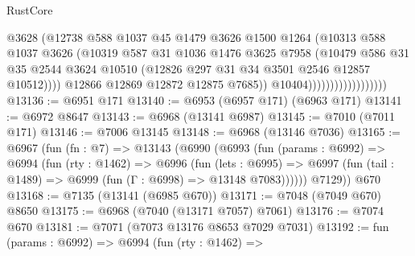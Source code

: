 \begin{lexlean}{RustCore}
\begin{coremodule}
                                          @3628
                                          (@12738
                                            @588
                                            @1037
                                            @45
                                            @1479
                                            @3626
                                            @1500
                                            @1264
                                            (@10313
                                              @588
                                              @1037
                                              @3626
                                              (@10319
                                                @587
                                                @31
                                                @1036
                                                @1476
                                                @3625
                                                @7958
                                                (@10479
                                                  @586
                                                  @31
                                                  @35
                                                  @2544
                                                  @3624
                                                  @10510
                                                  (@12826 @297 @31 @34 @3501 @2546 @12857 @10512))))
                                            @12866
                                            @12869
                                            @12872
                                            @12875
                                            @7685))
                                        @10404))))))))))))))))))
@13136 := @6951 @171
@13140 := @6953 (@6957 @171) (@6963 @171)
@13141 := @6972 @8647
@13143 := @6968 (@13141 @6987)
@13145 := @7010 (@7011 @171)
@13146 := @7006 @13145
@13148 := @6968 (@13146 @7036)
@13165 := @6967
    (fun (fn : @7) =>
    @13143
      (@6990
        (@6993
          (fun (params : @6992) =>
          @6994
            (fun (rty : @1462) =>
            @6996
              (fun (lets : @6995) =>
              @6997 (fun (tail : @1489) => @6999 (fun (Γ : @6998) => @13148 @7083))))))
        @7129))
    @670
@13168 := @7135 (@13141 (@6985 @670))
@13171 := @7048 (@7049 @670) @8650
@13175 := @6968 (@7040 (@13171 @7057) @7061)
@13176 := @7074 @670
@13181 := @7071 (@7073 @13176 @8653 @7029 @7031)
@13192 := fun (params : @6992) =>
  @6994
    (fun (rty : @1462) =>

\end{coremodule}
\end{lexlean}
